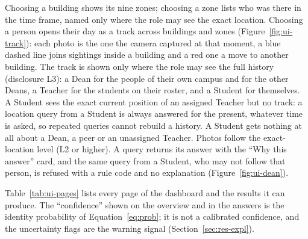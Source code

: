 \documentclass[12pt,a4paper,oneside]{report}
\begin{document}
Choosing a building shows its nine zones; choosing a zone lists who was there in the time frame, named only where the role may see the exact location. Choosing a person opens their day as a track across buildings and zones (Figure~\ref{fig:ui-track}): each photo is the one the camera captured at that moment, a blue dashed line joins sightings inside a building and a red one a move to another building. The track is shown only where the role may see the full history (disclosure L3): a Dean for the people of their own campus and for the other Deans, a Teacher for the students on their roster, and a Student for themselves. A Student sees the exact current position of an assigned Teacher but no track: a location query from a Student is always answered for the present, whatever time is asked, so repeated queries cannot rebuild a history. A Student gets nothing at all about a Dean, a peer or an unassigned Teacher. Photos follow the exact-location level (L2 or higher). A query returns its answer with the ``Why this answer'' card, and the same query from a Student, who may not follow that person, is refused with a rule code and no explanation (Figure~\ref{fig:ui-dean}).

Table~\ref{tab:ui-pages} lists every page of the dashboard and the results it can produce. The ``confidence'' shown on the overview and in the answers is the identity probability of Equation~\ref{eq:prob}; it is not a calibrated confidence, and the uncertainty flags are the warning signal (Section~\ref{sec:res-expl}).
\end{document}
